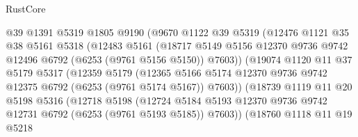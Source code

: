 \begin{lexlean}{RustCore}
\begin{coremodule}
                        @39
                        @1391
                        @5319
                        @1805
                        @9190
                        (@9670
                          @1122
                          @39
                          @5319
                          (@12476
                            @1121
                            @35
                            @38
                            @5161
                            @5318
                            (@12483
                              @5161
                              (@18717
                                @5149
                                @5156
                                @12370
                                @9736
                                @9742
                                @12496
                                @6792
                                (@6253 (@9761 @5156 @5150))
                                @7603))
                            (@19074
                              @1120
                              @11
                              @37
                              @5179
                              @5317
                              (@12359
                                @5179
                                (@12365
                                  @5166
                                  @5174
                                  @12370
                                  @9736
                                  @9742
                                  @12375
                                  @6792
                                  (@6253 (@9761 @5174 @5167))
                                  @7603))
                              (@18739
                                @1119
                                @11
                                @20
                                @5198
                                @5316
                                (@12718
                                  @5198
                                  (@12724
                                    @5184
                                    @5193
                                    @12370
                                    @9736
                                    @9742
                                    @12731
                                    @6792
                                    (@6253 (@9761 @5193 @5185))
                                    @7603))
                                (@18760
                                  @1118
                                  @11
                                  @19
                                  @5218

\end{coremodule}
\end{lexlean}

